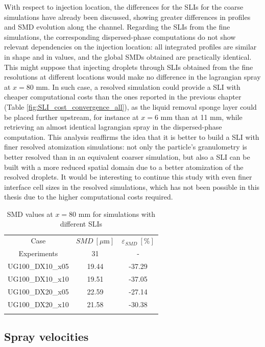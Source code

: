 With respect to injection location, the differences for the SLIs for the coarse simulations have already been discussed, showing greater differences in profiles and SMD evolution along the channel. Regarding the SLIs from the fine simulations, the corresponding dispersed-phase computations do not show relevant dependencies on the injection location: all integrated profiles are similar in shape and in values, and the global SMDs obtained are practically identical. This might suppose that injecting droplets through SLIs obtained from the fine resolutions at different locations would make no difference in the lagrangian spray at $x = 80$ mm. In such case, a resolved simulation could provide a SLI with cheaper computational costs than the ones reported in the previous chapter (Table \ref{fig:SLI_cost_convergence_all}), as the liquid removal sponge layer could be placed further upstream, for instance at $x = 6$ mm than at 11 mm, while retrieving an almost identical lagrangian spray in the dispersed-phase computation. This analysis reaffirms the idea that it is better to build a SLI with finer resolved atomization simulations: not only the particle's granulometry is better resolved than in an equivalent coarser simulation, but also a SLI can be built with a more reduced spatial domain due to a better atomization of the resolved droplets. It would be interesting to continue this study with even finer interface cell sizes in the resolved simulations, which has not been possible in this thesis due to the higher computational costs required. 


\begin{table}[!h]
\centering
\caption{SMD values at $x = 80$ mm for simulations with different SLIs}
\begin{tabular}{ccc}
\thickhline
Case & $SMD~\left[\mu \mathrm{m} \right]$ & $\varepsilon_{SMD}~\left[\% \right]$ \\
\thickhline
Experiments & 31 & - \\
UG100\_DX10\_x05 & 19.44 & -37.29 \\
UG100\_DX10\_x10 & 19.51 & -37.05 \\
UG100\_DX20\_x05 & 22.59 & -27.14 \\
UG100\_DX20\_x10 & 21.58 & -30.38 \\
\thickhline
\end{tabular}
\label{tab:SMD_deviations_turb_inj}
\end{table}



\subsection{Spray velocities}
\label{subsec:SLI_LGS_velocity_effects}

